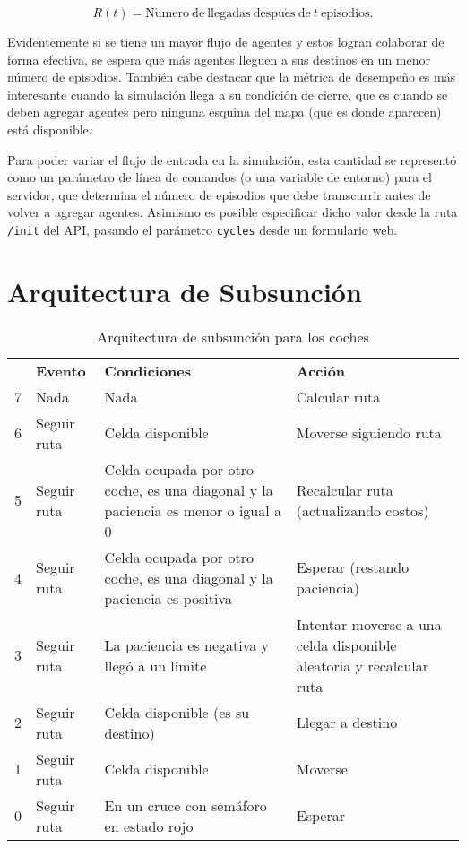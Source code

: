 \documentclass[twoside,11pt]{article}
\begin{document}
\begin{equation}\label{eq:metric}
  R(t) = \mathrm{N\acute{u}mero \ de \ llegadas \ despu\acute{e}s \ de \ } t \ \mathrm{episodios}.
\end{equation}

Evidentemente si se tiene un mayor flujo de agentes y estos logran colaborar de forma efectiva, se espera que
más agentes lleguen a sus destinos en un menor número de episodios. También cabe destacar que la métrica de desempeño
es más interesante cuando la simulación llega a su condición de cierre, que es cuando se deben agregar agentes pero ninguna esquina
del mapa (que es donde aparecen) está disponible.

Para poder variar el flujo de entrada en la simulación, esta cantidad se representó como un parámetro de línea de comandos (o una variable de entorno) 
para el servidor, que determina el número de episodios que debe transcurrir antes de volver a agregar agentes. Asimismo es posible especificar
dicho valor desde la ruta {\tt{/init}} del API, pasando el parámetro {\tt{cycles}} desde un formulario web.

\section{Arquitectura de Subsunción}\label{sec:arch}

\begin{table}[ht]
    \centering
    \begin{tabular}{c| >{\raggedright}p{} >{\raggedright}p{} >{\raggedright\arraybackslash}p{}|}
    \cline{2-4}
      & \textbf{Evento} & \textbf{Condiciones} & \textbf{Acción} \\\cline{2-4}
     7 & Nada & Nada & Calcular ruta \\\cline{2-4}
     6 & Seguir ruta & Celda disponible & Moverse siguiendo ruta\\\cline{2-4}
     5 & Seguir ruta & Celda ocupada por otro coche, es una diagonal y la paciencia es menor o igual a 0 & Recalcular ruta (actualizando costos)\\\cline{2-4}
     4 & Seguir ruta & Celda ocupada por otro coche, es una diagonal y la paciencia es positiva & Esperar (restando paciencia)\\\cline{2-4}
     3 & Seguir ruta & La paciencia es negativa y llegó a un límite & Intentar moverse a una celda disponible aleatoria y recalcular ruta\\\cline{2-4}
     2 & Seguir ruta & Celda disponible (es su destino)  & Llegar a destino\\\cline{2-4}
     1 & Seguir ruta & Celda disponible  & Moverse\\\cline{2-4}
     0 & Seguir ruta & En un cruce con semáforo en estado rojo & Esperar \\\cline{2-4}
    \end{tabular}
    \caption{Arquitectura de subsunción para los coches}
    \label{tab:arch}
\end{table}
\end{document}
